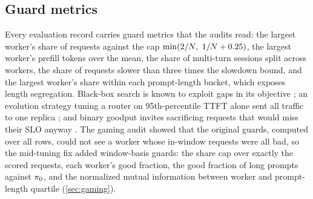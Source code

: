 \subsection{Guard metrics}

Every evaluation record carries guard metrics that the audits read: the largest worker's share of
requests against the cap $\min(2/N,\ 1/N + 0.25)$, the largest worker's prefill tokens over the
mean, the share of multi-turn sessions split across workers, the share of requests slower than three
times the slowdown bound, and the largest worker's share within each prompt-length bucket, which
exposes length segregation. Black-box search is known to exploit gaps in its objective
\citep{lehman2020creativity}; an evolution strategy tuning a router on 95th-percentile TTFT alone
sent all traffic to one replica \citep{toniolo2026gorgo}; and binary goodput invites sacrificing
requests that would miss their SLO anyway \citep{wang2024slo}. The gaming audit showed that the
original guards, computed over all rows, could not see a worker whose in-window requests were all
bad, so the mid-tuning fix added window-basis guards: the share cap over exactly the scored
requests, each worker's good fraction, the good fraction of long prompts against $\pi_{0}$, and the
normalized mutual information between worker and prompt-length quartile (\cref{sec:gaming}).

